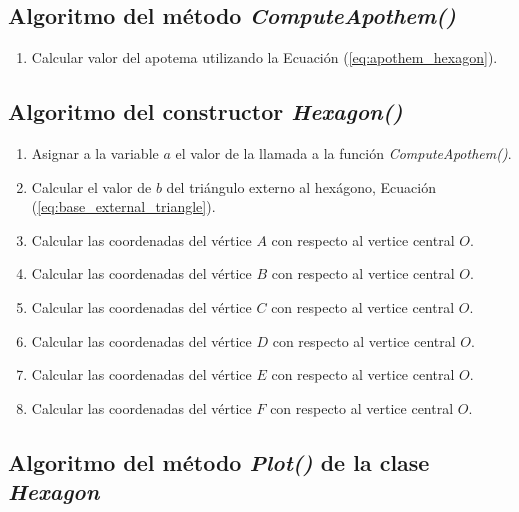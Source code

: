 \documentclass[oneside, a4paper]{article}
\begin{document}
        \subsection{Algoritmo del método \textit{ComputeApothem()}}

            \begin{enumerate}
                \item Calcular valor del apotema utilizando la Ecuación (\ref{eq:apothem_hexagon}).
            \end{enumerate}

        \subsection{Algoritmo del constructor \textit{Hexagon()}}
            
            \begin{enumerate}
                \item Asignar a la variable $a$ el valor de la llamada a la función \textit{ComputeApothem()}.
                \item Calcular el valor de $b$ del triángulo externo al hexágono, Ecuación (\ref{eq:base_external_triangle}).
                \item Calcular las coordenadas del vértice $A$ con respecto al vertice central $O$.
                \item Calcular las coordenadas del vértice $B$ con respecto al vertice central $O$.
                \item Calcular las coordenadas del vértice $C$ con respecto al vertice central $O$.
                \item Calcular las coordenadas del vértice $D$ con respecto al vertice central $O$.
                \item Calcular las coordenadas del vértice $E$ con respecto al vertice central $O$.
                \item Calcular las coordenadas del vértice $F$ con respecto al vertice central $O$.
            \end{enumerate}

        \subsection{Algoritmo del método \textit{Plot()} de la clase \textit{Hexagon}}
            
\end{document}
